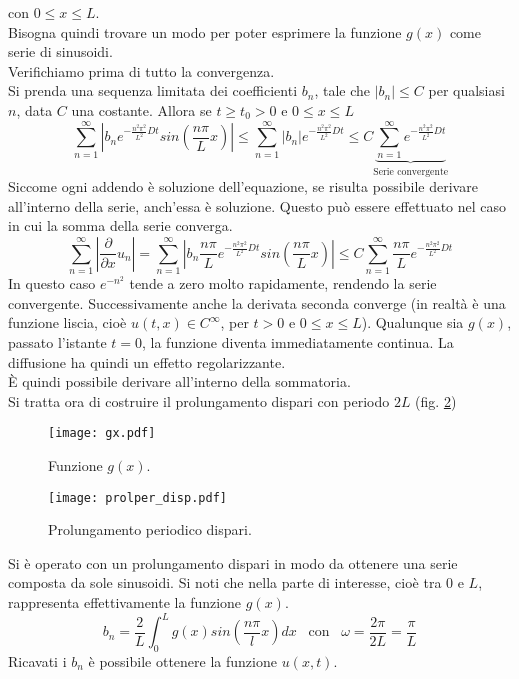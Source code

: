con $0\leq x \leq L$.\\
Bisogna quindi trovare un modo per poter esprimere la funzione $g(x)$
come serie di sinusoidi.\\
Verifichiamo prima di tutto la convergenza.\\
Si prenda una sequenza limitata dei coefficienti $b_n$, tale che
$|b_n|\leq C$ per qualsiasi $n$, data $C$ una costante. Allora se $t \geq t_0 >
0$
e $0\leq x \leq L$
\[
	\sum_{n=1}^{\infty}\left| b_n e^{-\frac{n^2\pi^2}{L^2} Dt}
	sin\left(\frac{n\pi}{L}x \right)\right|
	\leq
	\sum_{n=1}^{\infty}\left| b_n \right| e^{-\frac{n^2\pi^2}{L^2} Dt}
	\leq
	C \underbrace{\sum_{n=1}^{\infty}e^{-\frac{n^2\pi^2}{L^2} Dt}}
	_\text{Serie convergente}
\]
Siccome ogni addendo \`e soluzione dell'equazione, se risulta possibile
derivare all'interno della serie, anch'essa \`e soluzione. Questo pu\`o essere
effettuato nel caso in cui la somma della serie converga.
\[
	\sum_{n=1}^{\infty}\left| \frac{\partial}{\partial x} u_n \right|=
	\sum_{n=1}^{\infty}\left| b_n \frac{n\pi}{L}
	e^{-\frac{n^2\pi^2}{L^2} Dt}
	sin\left(\frac{n\pi}{L}x \right)\right|
	\leq
	C \sum_{n=1}^{\infty} \frac{n\pi}{L} e^{-\frac{n^2\pi^2}{L^2} Dt}
\]
In questo caso $e^{-n^2}$ tende a zero molto rapidamente, rendendo la serie
convergente. Successivamente anche la derivata seconda converge
(in realt\`a \`e una funzione liscia, cio\`e $u(t,x)\in C^\infty$,
per $t>0$ e $0\leq x \leq L$).
Qualunque sia $g(x)$, passato l'istante $t=0$, la funzione diventa
immediatamente
continua. La diffusione ha quindi un effetto regolarizzante.\\
\`E quindi possibile derivare all'interno della sommatoria.\\
Si tratta ora di costruire il prolungamento dispari con periodo $2L$ (fig.
\ref{prolper_disp})
\begin{figure}[H]
	\centering
	\texttt{[image: gx.pdf]}
	\caption{Funzione $g(x)$.}
	\label{gx}
\end{figure}
\begin{figure}[H]
	\centering
	\texttt{[image: prolper\_disp.pdf]}
	\caption{Prolungamento periodico dispari.}
	\label{prolper_disp}
\end{figure}
\noindent
Si \`e operato con un prolungamento dispari in modo da ottenere una serie
composta
da sole sinusoidi. Si noti che nella parte di interesse, cio\`e tra $0$ e $L$,
rappresenta effettivamente la funzione $g(x)$.
\[
	b_n= \frac{2}{L}\int_0^L g(x)sin \left(\frac{n\pi}{l} x\right) dx
	\;\;\; \text{con} \;\;\;
	\omega= \frac{2\pi}{2L}= \frac{\pi}{L}
\]
Ricavati i $b_n$ \`e possibile ottenere la funzione $u(x,t)$.

